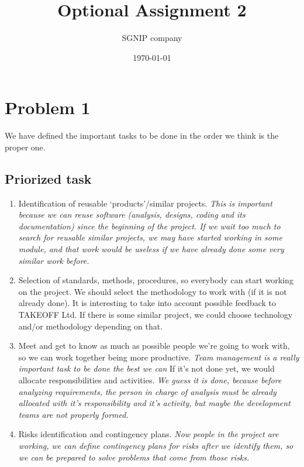 \documentclass{article}
\title{Optional Assignment 2}
\date{\today}
\author{SGNIP company}
\begin{document}
\maketitle

\newpage

\section{Problem 1}

We have defined the important tasks to be done in the order we think is the proper one.

\subsection{Priorized task}
\begin{enumerate}
\item Identification of reusable ‘products’/similar projects. \textit{This is important because we can reuse software (analysis, designs, coding and its documentation) since the beginning of the project. If we wait too much to search for reusable similar projects,  we may have started working in some module, and that work would be useless if we have already done some very similar work before.}



\item Selection of standards, methods, procedures, so everybody can start working on the project. We should select the methodology to work with (if it is not already done). It is interesting to take into account possible feedback to TAKEOFF Ltd. If there is some similar project, we could choose technology and/or methodology depending on that.


\item Meet and get to know as much as possible people we're going to work with, so we can work together being more productive. \textit{Team management is a really important task to be done the best we can}
 If it's not done yet, we would allocate responsibilities and activities.
\textit{We guess it is done, because before analyzing requirements, the person in charge of analysis must be already allocated with it's responsibility and it's activity, but maybe the development teams are not properly formed.}

\item Risks identification and contingency plans. \textit{Now people in the project are working, we can define contingency plans for risks after we identify them, so we can be prepared to solve problems that come from those risks.}


\end{enumerate}
\end{document}
